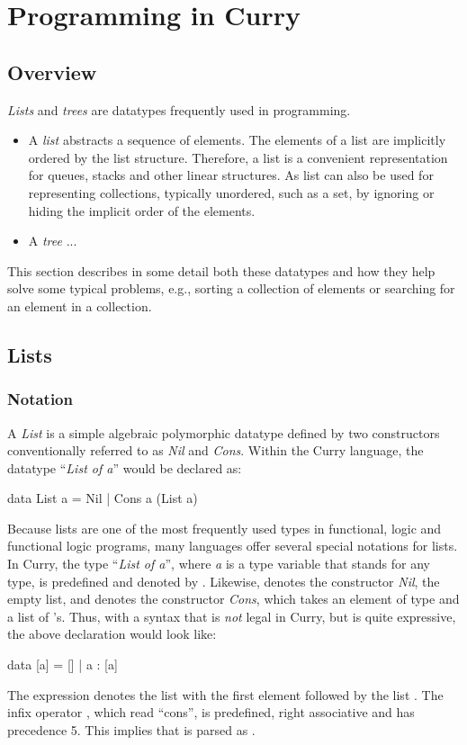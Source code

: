 \chapter{Programming in Curry}

\section{Overview}

\emph{Lists} and \emph{trees}
are datatypes frequently used in programming.

\begin{itemize}
\item{} 
A \emph{list} abstracts a sequence of elements.
The elements of a list are implicitly ordered by the list structure.
Therefore, a list is a convenient representation for queues, stacks
and other linear structures.
As list can also be used for representing collections, typically
unordered, such as a set, by ignoring or hiding the implicit
order of the elements.
\item{} 
A \emph{tree} ...
\end{itemize}
%
This section describes in some detail both these datatypes and how
they help solve some typical problems, e.g., sorting a
collection of elements or searching for an element in a collection.

\section{Lists}

\subsection{Notation}

A \emph{List} is a simple algebraic polymorphic
datatype defined by two constructors conventionally referred to
as \emph{Nil} and \emph{Cons}.
Within the Curry language, the datatype ``\emph{List of a}''
would be declared as:
%
\begin{prog}
data List a = Nil | Cons a (List a)
\end{prog}
%
Because lists are one of the most frequently used types in
functional, logic and functional logic programs,
many languages offer several special notations for lists.
In Curry, the type ``\emph{List of a}'',
where \emph{a} is a type variable that stands for any type,
is predefined and denoted by \code{[a]}.
Likewise, \code{[]} denotes the constructor \emph{Nil}, the empty list,
and \ccode{:}\pindex{:} denotes the constructor \emph{Cons}, which
takes an element of type  and a list of 's.
Thus, with a syntax that is \emph{not} legal in Curry, but
is quite expressive, the above declaration would look like:
%
\begin{prog}
data [a] = [] | a : [a]
\end{prog}
%
The expression  denotes the list with the first element 
followed by the list .
The infix operator \ccode{:}, which read ``cons'',
is predefined, right associative and has precedence 5.
This implies that  is parsed as .

